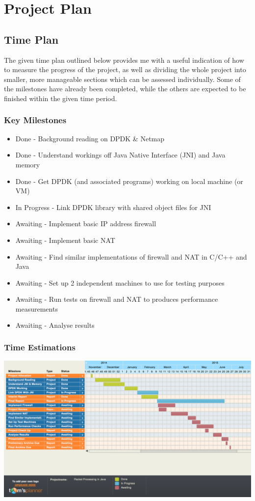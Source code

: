 \documentclass[interim_report.tex]{subfiles}
\begin{document}
\section{Project Plan}
\subsection{Time Plan}
The given time plan outlined below provides me with a useful indication of how to measure the progress of the project, as well as dividing the whole project into smaller, more manageable sections which can be assessed individually. Some of the milestones have already been completed, while the others are expected to be finished within the given time period.
\subsubsection{Key Milestones}
\begin{itemize}
	\item Done - Background reading on DPDK \& Netmap
	\item Done - Understand workings off Java Native Interface (JNI) and Java memory
	\item Done - Get DPDK (and associated programs) working on local machine (or VM)
	\item In Progress - Link DPDK library with shared object files for JNI
	\item Awaiting - Implement basic IP address firewall
	\item Awaiting - Implement basic NAT
	\item Awaiting - Find similar implementations of firewall and NAT in C/C++ and Java
	\item Awaiting - Set up 2 independent machines to use for testing purposes
	\item Awaiting - Run tests on firewall and NAT to produces performance measurements
	\item Awaiting - Analyse results
\end{itemize}

\subsubsection{Time Estimations}
\begin{center}
	\includegraphics[width=\textwidth]{img/timeline.png}
\end{center}
\end{document}
